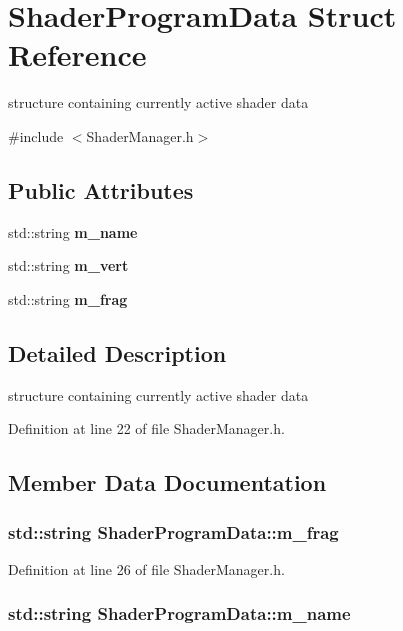 \section{Shader\-Program\-Data Struct Reference}
\label{struct_shader_program_data}


structure containing currently active shader data  




{\ttfamily \#include $<$Shader\-Manager.\-h$>$}

\subsection*{Public Attributes}
\begin{DoxyCompactItemize}
\item 
std\-::string {\bf m\-\_\-name}
\item 
std\-::string {\bf m\-\_\-vert}
\item 
std\-::string {\bf m\-\_\-frag}
\end{DoxyCompactItemize}


\subsection{Detailed Description}
structure containing currently active shader data 

Definition at line 22 of file Shader\-Manager.\-h.



\subsection{Member Data Documentation}
\subsubsection[{m\-\_\-frag}]{\setlength{\rightskip}{0pt plus 5cm}std\-::string Shader\-Program\-Data\-::m\-\_\-frag}\label{struct_shader_program_data_ac7673d1c2fa7552e408a428ad7084913}


Definition at line 26 of file Shader\-Manager.\-h.

\subsubsection[{m\-\_\-name}]{\setlength{\rightskip}{0pt plus 5cm}std\-::string Shader\-Program\-Data\-::m\-\_\-name}\label{struct_shader_program_data_a729c4f0580b704113d9b897fe4165ad6}


